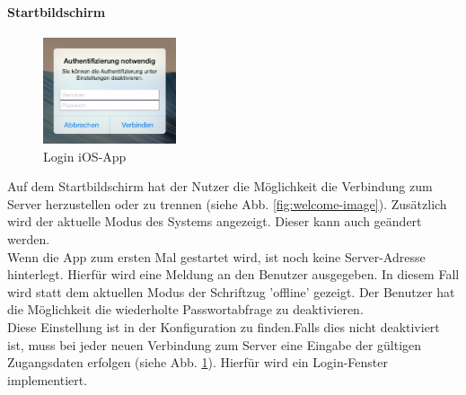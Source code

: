 \paragraph{Startbildschirm} 
\begin{figure}
	\vspace{-20pt}
	\begin{center}
		\includegraphics[width=0.35\textwidth]{./data/login.png}
	\end{center}
	\vspace{-20pt}
	\caption{\label{fig:login-image}Login iOS-App}
	\vspace{-10pt}
\end{figure}
Auf dem Startbildschirm hat der Nutzer die Möglichkeit die Verbindung zum Server herzustellen oder zu trennen (siehe Abb. \ref{fig:welcome-image}). Zusätzlich wird der aktuelle Modus des Systems angezeigt. Dieser kann auch geändert werden.\\
Wenn die App zum ersten Mal gestartet wird, ist noch keine Server-Adresse hinterlegt. Hierfür wird eine Meldung an den Benutzer ausgegeben. In diesem Fall wird statt dem aktuellen Modus der Schriftzug 'offline' gezeigt.
Der Benutzer hat die Möglichkeit die wiederholte Passwortabfrage zu deaktivieren.\\
Diese Einstellung ist in der Konfiguration zu finden.Falls dies nicht deaktiviert ist, muss bei jeder neuen Verbindung zum Server eine Eingabe der gültigen Zugangsdaten erfolgen (siehe Abb. \ref{fig:login-image}). Hierfür wird ein Login-Fenster implementiert.
